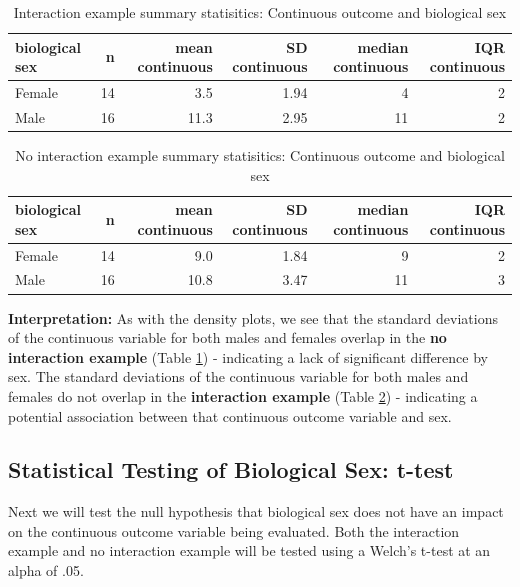 \documentclass[
]{book}
\begin{document}
\begin{table}

\caption{\label{tab:03-tab-int}Interaction example summary statisitics: Continuous outcome and biological sex}
\centering
\begin{tabular}[t]{lrrrrr}
\toprule
biological sex & n & mean continuous & SD continuous & median continuous & IQR continuous\\
\midrule
Female & 14 & 3.5 & 1.94 & 4 & 2\\
Male & 16 & 11.3 & 2.95 & 11 & 2\\
\bottomrule
\end{tabular}
\end{table}

\begin{table}

\caption{\label{tab:03-tab-no-int}No interaction example summary statisitics: Continuous outcome and biological sex}
\centering
\begin{tabular}[t]{lrrrrr}
\toprule
biological sex & n & mean continuous & SD continuous & median continuous & IQR continuous\\
\midrule
Female & 14 & 9.0 & 1.84 & 9 & 2\\
Male & 16 & 10.8 & 3.47 & 11 & 3\\
\bottomrule
\end{tabular}
\end{table}

\textbf{Interpretation:} As with the density plots, we see that the standard deviations of the continuous variable for both males and females overlap in the \textbf{no interaction example} (Table \ref{tab:03-tab-int}) - indicating a lack of significant difference by sex. The standard deviations of the continuous variable for both males and females do not overlap in the \textbf{interaction example} (Table \ref{tab:03-tab-no-int}) - indicating a potential association between that continuous outcome variable and sex.

\subsection{Statistical Testing of Biological Sex: t-test}\label{statistical-testing-of-biological-sex-t-test}

Next we will test the null hypothesis that biological sex does not have an impact on the continuous outcome variable being evaluated. Both the interaction example and no interaction example will be tested using a Welch's t-test at an alpha of .05.
\end{document}

